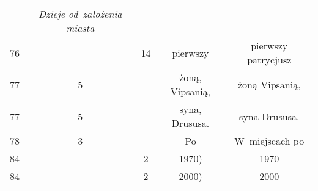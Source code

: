 \documentclass[a4paper,11pt]{article}
\begin{document}
\begin{center}
\begin{tabular}{|c|c|c|c|c|}
    & \textit{Dzieje od~założenia miasta} \\
    76 & & 14 & pierwszy & pierwszy patrycjusz \\
    77 & \hphantom{0}5 & & żoną, Vipsanią, & żoną Vipsanią, \\
    77 & \hphantom{0}5 & & syna, Drususa. & syna Drususa. \\
    78 & \hphantom{0}3 & & Po & W~miejscach po \\
    84 & & \hphantom{0}2 & 1970) & 1970 \\
    84 & & \hphantom{0}2 & 2000) & 2000 \\
    \hline
  \end{tabular}





  \newpage


\end{center}
\end{document}
